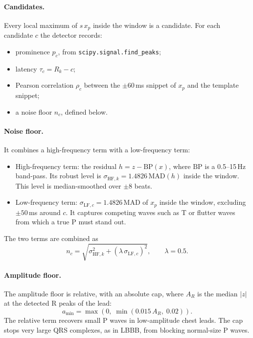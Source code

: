 \documentclass[11pt,a4paper]{article}
\newcommand{\code}[1]{\texttt{#1}}
\begin{document}
\paragraph{Candidates.} Every local maximum of $s\,x_p$ inside the window is a candidate. For each candidate $c$ the detector records:
\begin{itemize}
\item prominence $p_c$, from \code{scipy.signal.find\_peaks};
\item latency $\tau_c = R_k - c$;
\item Pearson correlation $\rho_c$ between the $\pm60$\,ms snippet of $x_p$ and the template snippet;
\item a noise floor $n_c$, defined below.
\end{itemize}

\paragraph{Noise floor.} It combines a high-frequency term with a low-frequency term:
\begin{itemize}
\item High-frequency term: the residual $h = z - \mathrm{BP}(x)$, where $\mathrm{BP}$ is a 0.5--15\,Hz band-pass. Its robust level is $\sigma_{\mathrm{HF},k} = 1.4826\,\mathrm{MAD}(h)$ inside the window. This level is median-smoothed over $\pm8$ beats.
\item Low-frequency term: $\sigma_{\mathrm{LF},c} = 1.4826\,\mathrm{MAD}$ of $x_p$ inside the window, excluding $\pm50$\,ms around $c$. It captures competing waves such as T or flutter waves from which a true P must stand out.
\end{itemize}
The two terms are combined as
\begin{equation}
n_c = \sqrt{\sigma_{\mathrm{HF},k}^2 + \left(\lambda\,\sigma_{\mathrm{LF},c}\right)^2}, \qquad \lambda = 0.5.
\end{equation}

\paragraph{Amplitude floor.} The amplitude floor is relative, with an absolute cap, where $A_R$ is the median $|z|$ at the detected R peaks of the lead:
\begin{equation}
a_\mathrm{min} = \max\left(0,\; \min\left(0.015\,A_R,\; 0.02\right)\right).
\end{equation}
The relative term recovers small P waves in low-amplitude chest leads. The cap stops very large QRS complexes, as in LBBB, from blocking normal-size P waves.
\end{document}
